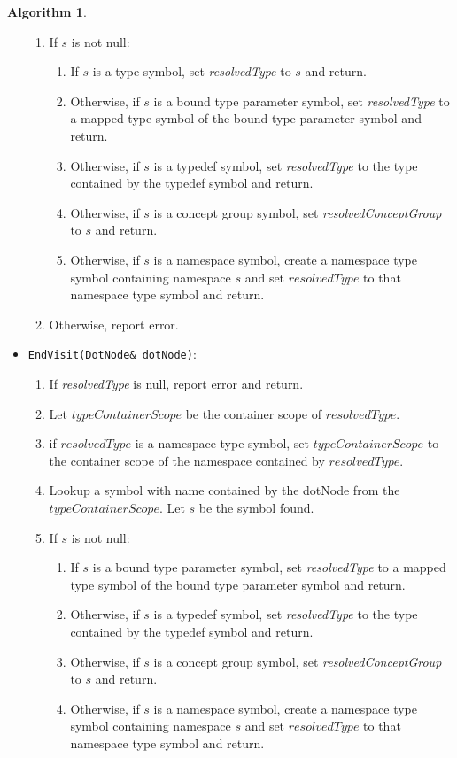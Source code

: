 \documentclass[a4paper,oneside,11pt]{book}
\theoremstyle{definition}
\newtheorem{algo}{Algorithm}[section]
\begin{document}
\begin{algo}
\begin{itemize}
\begin{enumerate}
\item
If $s$ is not null:
\begin{enumerate}
\item
If $s$ is a type symbol, set \emph{resolvedType} to $s$ and return.
\item
Otherwise, if $s$ is a bound type parameter symbol, set \emph{resolvedType} to a mapped type symbol of the bound type parameter symbol and return.
\item
Otherwise, if $s$ is a typedef symbol, set \emph{resolvedType} to the type contained by the typedef symbol and return.
\item
Otherwise, if $s$ is a concept group symbol, set \emph{resolvedConceptGroup} to $s$ and return.
\item
Otherwise, if $s$ is a namespace symbol, create a namespace type symbol containing namespace $s$ and set $resolvedType$ to that namespace type symbol and return.
\end{enumerate}
\item
Otherwise, report error.
\end{enumerate}
\item
\verb|EndVisit(DotNode& dotNode)|:\\
\begin{enumerate}
\item
If \emph{resolvedType} is null, report error and return.
\item
Let $typeContainerScope$ be the container scope of $resolvedType$.
\item
if $resolvedType$ is a namespace type symbol, set $typeContainerScope$ to the container scope of the namespace contained by $resolvedType$.
\item
Lookup a symbol with name contained by the dotNode from the $typeContainerScope$. Let $s$ be the symbol found.
\item
If $s$ is not null:
\begin{enumerate}
\item
If $s$ is a bound type parameter symbol, set \emph{resolvedType} to a mapped type symbol of the bound type parameter symbol and return.
\item
Otherwise, if $s$ is a typedef symbol, set \emph{resolvedType} to the type contained by the typedef symbol and return.
\item
Otherwise, if $s$ is a concept group symbol, set \emph{resolvedConceptGroup} to $s$ and return.
\item
Otherwise, if $s$ is a namespace symbol, create a namespace type symbol containing namespace $s$ and set $resolvedType$ to that namespace type symbol and return.

\end{enumerate}
\end{enumerate}
\end{itemize}
\end{algo}
\end{document}
